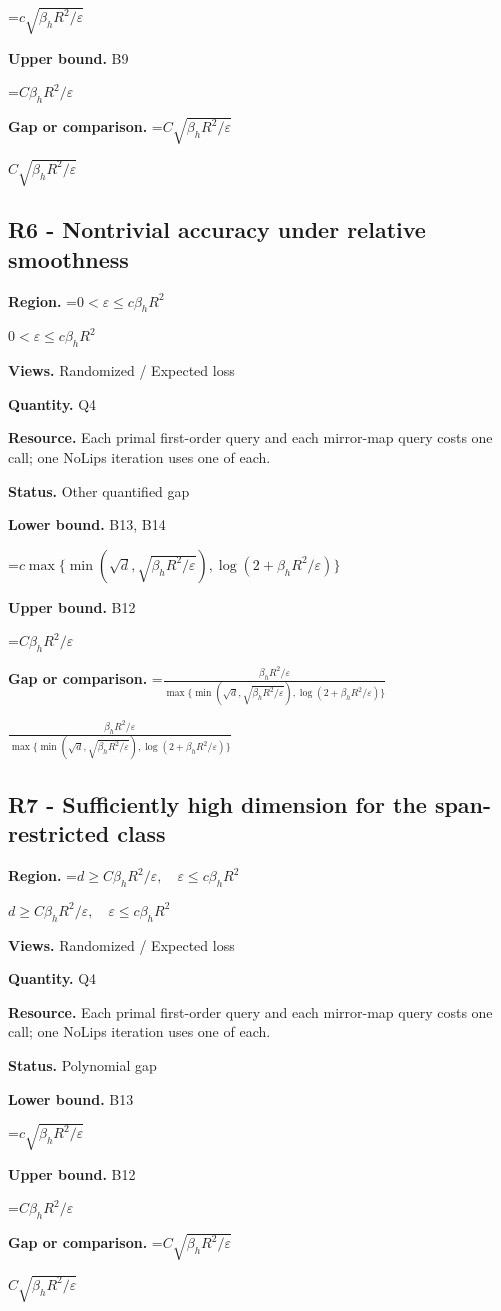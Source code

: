 \documentclass[10pt,a4paper]{article}
\newcommand{\AtlasMath}[1]{\par\begingroup\centering\setbox0=\hbox{$\displaystyle #1$}\ifdim\wd0>1.4\linewidth\typeout{ATLAS WIDE FORMULA: \the\wd0}\fi\ifdim\wd0>\linewidth\resizebox{\linewidth}{!}{\box0}\else\box0\fi\par\endgroup}
\newcommand{\AtlasInlineMath}[1]{\begingroup\setbox0=\hbox{$#1$}\ifdim\wd0>.4\linewidth\endgroup\AtlasMath{#1}\else\endgroup$#1$\fi}
\begin{document}
\AtlasMath{c\sqrt{\beta_hR^2/\varepsilon}}
\textbf{Upper bound.} B9

\AtlasMath{C\beta_hR^2/\varepsilon}
\textbf{Gap or comparison.} \AtlasInlineMath{C\sqrt{\beta_hR^2/\varepsilon}}

\subsection{R6 - Nontrivial accuracy under relative smoothness}
\textbf{Region.} \AtlasInlineMath{0<\varepsilon\le c\beta_hR^2}

\textbf{Views.} Randomized / Expected loss

\textbf{Quantity.} Q4

\textbf{Resource.} Each primal first-order query and each mirror-map query costs one call; one NoLips iteration uses one of each.

\textbf{Status.} Other quantified gap

\textbf{Lower bound.} B13, B14

\AtlasMath{c\max\{\min(\sqrt d,\sqrt{\beta_hR^2/\varepsilon}),\log(2+\beta_hR^2/\varepsilon)\}}
\textbf{Upper bound.} B12

\AtlasMath{C\beta_hR^2/\varepsilon}
\textbf{Gap or comparison.} \AtlasInlineMath{\frac{\beta_hR^2/\varepsilon}{\max\{\min(\sqrt d,\sqrt{\beta_hR^2/\varepsilon}),\log(2+\beta_hR^2/\varepsilon)\}}}

\subsection{R7 - Sufficiently high dimension for the span-restricted class}
\textbf{Region.} \AtlasInlineMath{d\ge C\beta_hR^2/\varepsilon,\quad\varepsilon\le c\beta_hR^2}

\textbf{Views.} Randomized / Expected loss

\textbf{Quantity.} Q4

\textbf{Resource.} Each primal first-order query and each mirror-map query costs one call; one NoLips iteration uses one of each.

\textbf{Status.} Polynomial gap

\textbf{Lower bound.} B13

\AtlasMath{c\sqrt{\beta_hR^2/\varepsilon}}
\textbf{Upper bound.} B12

\AtlasMath{C\beta_hR^2/\varepsilon}
\textbf{Gap or comparison.} \AtlasInlineMath{C\sqrt{\beta_hR^2/\varepsilon}}
\end{document}
